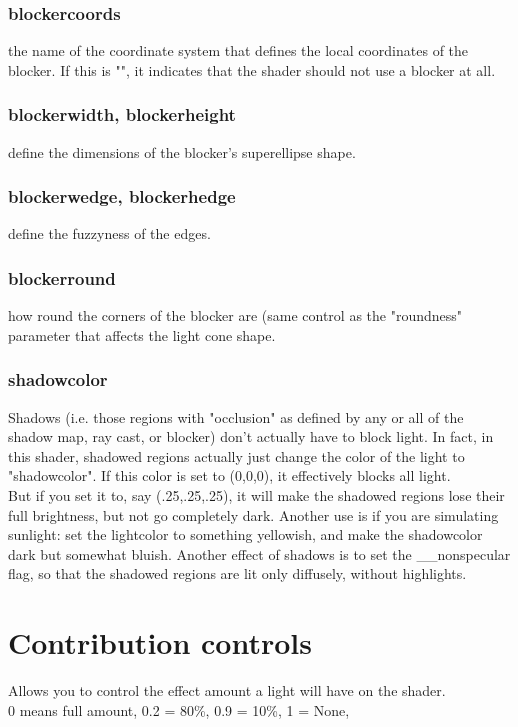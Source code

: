 \documentclass[final,letterpaper,twoside,12pt]{report}
\begin{document}
\subsubsection {blockercoords}
the name of the coordinate system that defines the  local coordinates of the blocker.  If this is "", it indicates  that the shader should not use a blocker at all.
\smallskip
\subsubsection {blockerwidth, blockerheight }
define the dimensions of the blocker's  superellipse shape.
\smallskip
\subsubsection {blockerwedge, blockerhedge }
define the fuzzyness of the edges.
\smallskip
\subsubsection {blockerround}
how round the corners of the blocker are (same  control as the "roundness" parameter that affects the light  cone shape.
\smallskip
\subsubsection {shadowcolor }
Shadows (i.e. those regions with "occlusion" as  defined by any or all of the shadow map, ray cast, or  blocker) don't actually have to block light.  In fact, in  this shader, shadowed regions actually just change the color  of the light to "shadowcolor".  If this color is set to  (0,0,0), it effectively blocks all light.\\
But if you set it  to, say (.25,.25,.25), it will make the shadowed regions lose  their full brightness, but not go completely dark.  Another  use is if you are simulating sunlight: set the lightcolor to  something yellowish, and make the shadowcolor dark but  somewhat bluish.  Another effect of shadows is to set the  \_\_nonspecular flag, so that the shadowed regions are lit only  diffusely, without highlights.
\smallskip
\section {Contribution controls}
Allows you to control the effect amount a light will have on the shader.\\
0 means full amount, 0.2 = 80\%, 0.9 = 10\%, 1 = None, 
\end{document}
